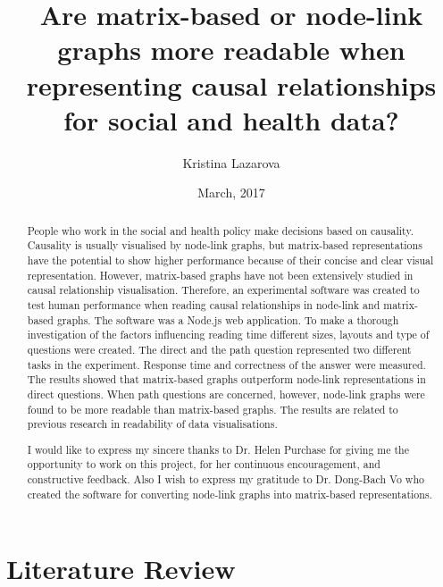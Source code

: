 \documentclass{l4proj}
\begin{document}
\title{Are matrix-based or node-link graphs more readable when representing causal relationships for social and health data?}
\author{Kristina Lazarova}
\date{March, 2017}
\maketitle


\begin{abstract}

People who work in the social and health policy make decisions based on causality. Causality is usually visualised by node-link graphs, but matrix-based representations have the potential to show higher performance because of their concise and clear visual representation. However, matrix-based graphs have not been extensively studied in causal relationship visualisation. Therefore, an experimental software was created to test human performance when reading causal relationships in node-link and matrix-based graphs. The software was a Node.js web application. To make a thorough investigation of the factors influencing reading time different sizes, layouts and type of questions were created. The direct and the path question represented two different tasks in the experiment. Response time and correctness of the answer were measured. The results showed that matrix-based graphs outperform node-link representations in direct questions. When path questions are concerned, however, node-link graphs were found to be more readable than matrix-based graphs. The results are related to previous research in readability of data visualisations.

\end{abstract}


\renewcommand{\abstractname}{Acknowledgements}
\begin{abstract}
I would like to express my sincere thanks to Dr. Helen Purchase for giving me the opportunity to work on this project, for her continuous encouragement, and constructive feedback. Also I wish to express my gratitude to Dr. Dong-Bach Vo who created the software for converting node-link graphs into matrix-based representations. 

\end{abstract}


\educationalconsent
%
%
\tableofcontents
\chapter{Literature Review}
\end{document}
